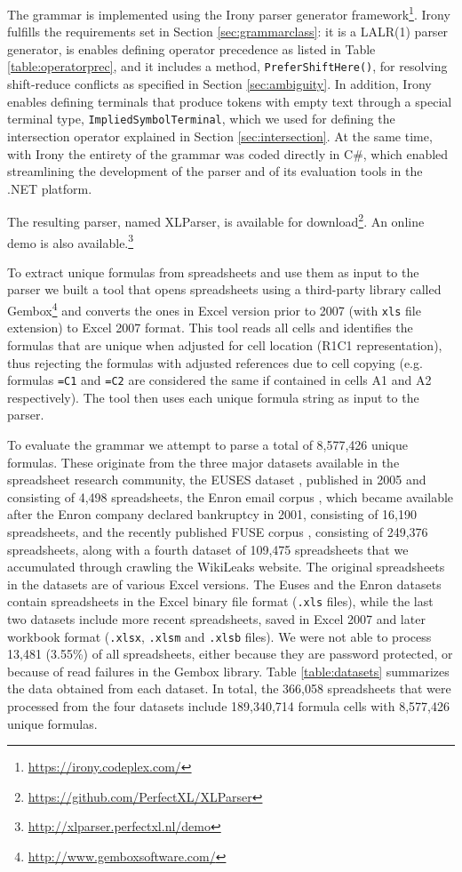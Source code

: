 \documentclass[times]{smrauth}
\begin{document}
The grammar is implemented using the Irony parser generator framework\footnote{\url{https://irony.codeplex.com/}}. Irony fulfills the requirements set in Section \ref{sec:grammarclass}: it is a LALR(1) parser generator, is enables defining operator precedence as listed in Table \ref{table:operatorprec}, and it includes a method, \texttt{PreferShiftHere()}, for resolving shift-reduce conflicts as specified in Section \ref{sec:ambiguity}. In addition, Irony enables defining terminals that produce tokens with empty text through a special terminal type, \texttt{ImpliedSymbolTerminal}, which we used for defining the intersection operator explained in Section \ref{sec:intersection}. At the same time, with Irony the entirety of the grammar was coded directly in C\#, which enabled streamlining the development of the parser and of its evaluation tools in the .NET platform.

The resulting parser, named XLParser, is available for download\footnote{\url{https://github.com/PerfectXL/XLParser}}. An online demo is also available.\footnote{\url{http://xlparser.perfectxl.nl/demo}}

To extract unique formulas from spreadsheets and use them as input to the parser we built a tool that opens spreadsheets using a third-party library called Gembox\footnote{\url{http://www.gemboxsoftware.com/}} and converts the ones in Excel version prior to 2007 (with \texttt{xls} file extension) to Excel 2007 format. This tool reads all cells and identifies the formulas that are unique when adjusted for cell location (R1C1 representation), thus rejecting the formulas with adjusted references due to cell copying (e.g. formulas \texttt{=C1} and \texttt{=C2} are considered the same if contained in cells A1 and A2 respectively). The tool then uses each unique formula string as input to the parser.

To evaluate the grammar we attempt to parse a total of 8,577,426 unique formulas. These originate from the three major datasets available in the spreadsheet research community, the EUSES dataset \cite{euses}, published in 2005 and consisting of 4,498 spreadsheets, the Enron email corpus \cite{enron}, which became available after the Enron company declared bankruptcy in 2001, consisting of 16,190 spreadsheets, and the recently published FUSE corpus \cite{fuse}, consisting of 249,376 spreadsheets, along with a fourth dataset of 109,475 spreadsheets that we accumulated through crawling the WikiLeaks website. The original spreadsheets in the datasets are of various Excel versions. The Euses and the Enron datasets contain spreadsheets in the Excel binary file format (\texttt{.xls} files), while the last two datasets include more recent spreadsheets, saved in Excel 2007 and later workbook format (\texttt{.xlsx}, \texttt{.xlsm} and \texttt{.xlsb} files). We were not able to process 13,481 (3.55\%) of all spreadsheets, either because they are password protected, or because of read failures in the Gembox library. Table \ref{table:datasets} summarizes the data obtained from each dataset. In total, the 366,058 spreadsheets that were processed from the four datasets include 189,340,714 formula cells with 8,577,426 unique formulas.
\end{document}
